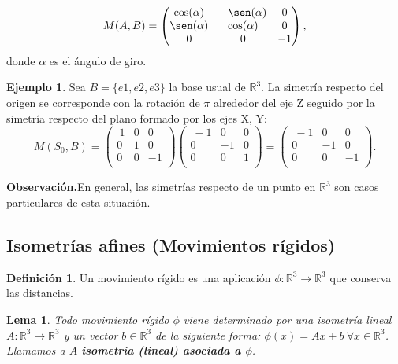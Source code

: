 \documentclass[11pt]{article}
\newtheorem{lema}{Lema}[section]
\theoremstyle{definition}
\newtheorem{mydef}{Definición}[section]
\newtheorem{ejemplo}{Ejemplo}[section]
\begin{document}
    \[M(A, B)=\begin{pmatrix}\cos(\alpha)&-\sen(\alpha)&0\\\sen(\alpha)&\cos(\alpha)&0\\0&0&-1\end{pmatrix},\]
donde $\alpha$ es el ángulo de giro.

\begin{ejemplo}
Sea $B=\{e1 , e2 , e3\}$ la base usual de  $\mathbb{R}^3$. La simetría respecto del origen se corresponde con la rotación de $\pi$ alrededor del eje Z seguido por la simetría respecto del plano formado por los ejes X, Y:  
\[M(S_0,B)=
    \begin{pmatrix} 
    \ 1 & 0 & 0 \\ 0 & 1 & 0 \\ 0 & 0 & -1 \\ 
    \end{pmatrix}
    \begin{pmatrix} 
    \ -1 & 0 & 0 \\ 0 & -1 & 0 \\ 0 & 0 & 1 \\ 
    \end{pmatrix}=
    \begin{pmatrix} 
    \ -1 & 0 & 0 \\ 0 & -1 & 0 \\ 0 & 0 & -1 \\ 
    \end{pmatrix}.
  \]
\end{ejemplo}

\noindent\textbf{Observación.}\quad En general, las simetrías respecto de un punto en $\mathbb R^3$ son casos particulares de esta situación.
    \\
			 
\subsection{Isometrías afines (Movimientos rígidos)}
	\begin{mydef}
    Un movimiento rígido es una aplicación $\phi:\mathbb R^3\rightarrow\mathbb R^3$ que conserva las distancias. 
    \end{mydef}
    \begin{lema}
    Todo movimiento rígido $\phi$ viene determinado por una isometría lineal $A:\mathbb R^3\rightarrow\mathbb R^3$ y un vector $b\in \mathbb R^3$ de la siguiente forma: $\phi(x)=Ax+b\ \forall x\in\mathbb R^3$. Llamamos a $A$ \textbf{isometría (lineal) asociada a $\phi$}.
    \end{lema}
\end{document}
